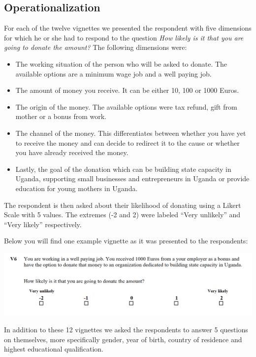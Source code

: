 \documentclass[12pt,]{article}
\providecommand{\tightlist}{%
  \setlength{\itemsep}{0pt}\setlength{\parskip}{0pt}}
\begin{document}
\hypertarget{operationalization}{%
\subsection{Operationalization}\label{operationalization}}

For each of the twelve vignettes we presented the respondent with five
dimensions for which he or she had to respond to the question \emph{How
likely is it that you are going to donate the amount?} The following
dimensions were:

\begin{itemize}
\tightlist
\item
  The working situation of the person who will be asked to donate. The
  available options are a minimum wage job and a well paying job.
\item
  The amount of money you receive. It can be either 10, 100 or 1000
  Euros.
\item
  The origin of the money. The available options were tax refund, gift
  from mother or a bonus from work.
\item
  The channel of the money. This differentiates between whether you have
  yet to receive the money and can decide to redirect it to the cause or
  whether you have already received the money.
\item
  Lastly, the goal of the donation which can be building state capacity
  in Uganda, supporting small businesses and entrepreneurs in Uganda or
  provide education for young mothers in Uganda.
\end{itemize}

The respondent is then asked about their likelihood of donating using a
Likert Scale with 5 values. The extremes (-2 and 2) were labeled ``Very
unlikely'' and ``Very likely'' respectively.

Below you will find one example vignette as it was presented to the
respondents:

\includegraphics[width=1.05\linewidth]{Screenshot_vignette}

In addition to these 12 vignettes we asked the respondents to answer 5
questions on themselves, more specifically gender, year of birth,
country of residence and highest educational qualification.
\end{document}

